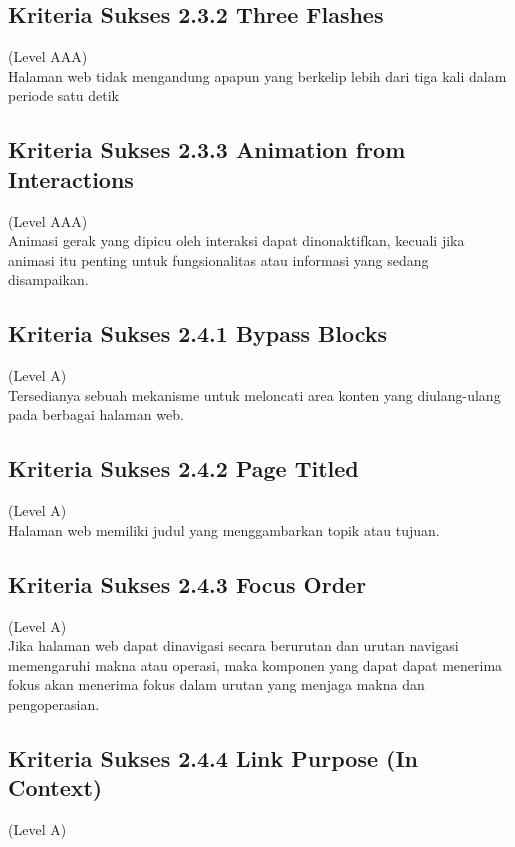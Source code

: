 \subsection{Kriteria Sukses 2.3.2 Three Flashes}
\label{subsec:kriteria_2.3.2}
(Level AAA) \\

Halaman web tidak mengandung apapun yang berkelip lebih dari tiga kali dalam periode satu detik


\subsection{Kriteria Sukses 2.3.3 Animation from Interactions}
\label{subsec:kriteria_2.3.3}
(Level AAA) \\

Animasi gerak yang dipicu oleh interaksi dapat dinonaktifkan, kecuali jika animasi itu penting untuk fungsionalitas atau informasi yang sedang disampaikan.

\subsection{Kriteria Sukses 2.4.1 Bypass Blocks}
\label{subsec:kriteria_2.4.1}
(Level A) \\

Tersedianya sebuah mekanisme untuk meloncati area konten yang diulang-ulang pada berbagai halaman web.

\subsection{Kriteria Sukses 2.4.2 Page Titled}
\label{subsec:kriteria_2.4.2}
(Level A) \\

Halaman web memiliki judul yang menggambarkan topik atau tujuan.

\subsection{Kriteria Sukses 2.4.3 Focus Order}
\label{subsec:kriteria_2.4.3}
(Level A) \\

Jika halaman web dapat dinavigasi secara berurutan dan urutan navigasi memengaruhi makna atau operasi, maka komponen yang dapat dapat menerima fokus akan menerima fokus dalam urutan yang menjaga makna dan pengoperasian.

\subsection{Kriteria Sukses 2.4.4 Link Purpose (In Context)}
\label{subsec:kriteria_2.4.4}
(Level A) \\

